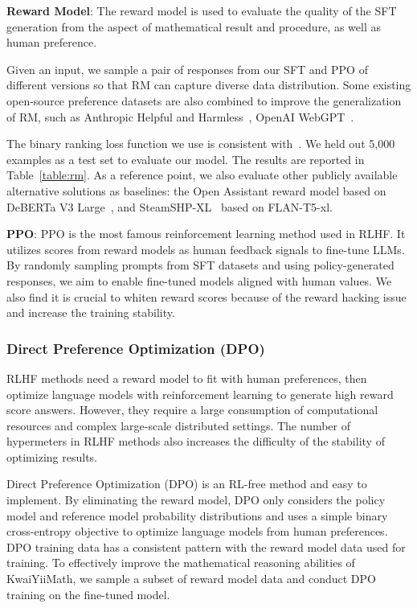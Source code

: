 \documentclass{article}
\begin{document}
\textbf{Reward Model}: The reward model is used to evaluate the quality of the SFT  generation from the aspect of mathematical result and procedure, as well as human preference.

Given an input, we sample a pair of responses from our SFT and PPO of different versions so that RM can capture diverse data distribution. Some existing open-source preference datasets are also combined to improve the generalization of RM, such as Anthropic Helpful and Harmless~\cite{bai2022training}, OpenAI WebGPT~\cite{nakano2021webgpt}. 
 
The binary ranking loss function we use is consistent with~\cite{ouyang2022training}. We held out 5,000 examples as a test set to evaluate our model. The results are reported in Table~\ref{table:rm}. As a reference point, we also evaluate other publicly available alternative solutions as baselines: the Open Assistant reward model based on DeBERTa V3 Large~\cite{he2020deberta}, and SteamSHP-XL~\cite{ethayarajh2022understanding} based on FLAN-T5-xl.

\textbf{PPO}: PPO is the most famous reinforcement learning method used in RLHF. It utilizes scores from reward models as human feedback signals to fine-tune LLMs. By randomly sampling prompts from SFT datasets and using policy-generated responses, we aim to enable fine-tuned models aligned with human values. We also find it is crucial to whiten reward scores because of the reward hacking issue and increase the training stability.

\subsubsection{Direct Preference Optimization (DPO) }
RLHF methods need a reward model to fit with human preferences, then optimize language models with reinforcement learning to generate high reward score answers. However, they require a large consumption of computational resources and complex large-scale distributed settings. The number of hypermeters in RLHF methods also increases the difficulty of the stability of optimizing results. 

Direct Preference Optimization (DPO) is an RL-free method and easy to implement. By eliminating the reward model, DPO only considers the policy model and reference model probability distributions and uses a simple binary cross-entropy objective to optimize language models from human preferences. DPO training data has a consistent pattern with the reward model data used for training. To effectively improve the mathematical reasoning abilities of KwaiYiiMath, we sample a subset of reward model data and conduct DPO training on the fine-tuned model.
\end{document}
